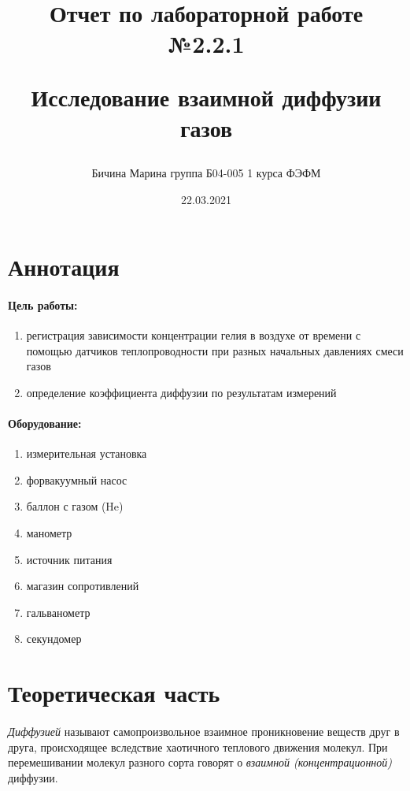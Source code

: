 \documentclass[a4paper,12pt]{article}
\author{Бичина Марина 
группа Б04-005 1 курса ФЭФМ}
\title{Отчет по лабораторной работе №2.2.1


Исследование взаимной диффузии газов}
\date{22.03.2021}
\begin{document}

\maketitle
\newpage

\section{Аннотация}

\paragraph{Цель работы:} 
\begin{enumerate}
\itemsep0em
\item регистрация зависимости концентрации гелия в воздухе от времени с помощью датчиков теплопроводности при разных начальных давлениях смеси газов
\item определение коэффициента диффузии по результатам измерений
\end{enumerate}
\paragraph{Оборудование:}
\begin{enumerate}
\itemsep0em
\item измерительная установка
\item форвакуумный насос 
\item баллон с газом (He)
\item манометр
\item источник питания
\item магазин сопротивлений 
\item гальванометр
\item секундомер
\end{enumerate}
\section{Теоретическая часть}

\paragraph{} \textit{Диффузией} называют самопроизвольное взаимное проникновение веществ друг в друга, происходящее вследствие хаотичного теплового движения молекул. При перемешивании молекул разного сорта говорят о \textit{взаимной (концентрационной)} диффузии.
\end{document}
